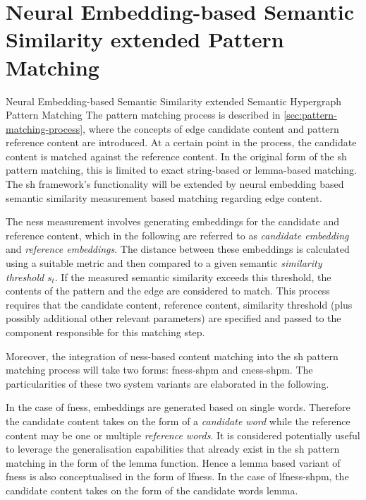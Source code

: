 \documentclass[11pt]{scrreprt}
\begin{document}
\section{Neural Embedding-based Semantic Similarity extended Pattern Matching}{Neural Embedding-based Semantic Similarity extended Semantic Hypergraph Pattern Matching}
The pattern matching process is described in \cref{sec:pattern-matching-process}, where the concepts of edge candidate content and pattern reference content are introduced. At a certain point in the process, the candidate content is matched against the reference content. In the original form of the \gls{sh} pattern matching, this is limited to exact string-based or lemma-based matching. The \gls{sh} framework's functionality will be extended by neural embedding based semantic similarity measurement based matching regarding edge content.

The \gls{ness} measurement involves generating embeddings for the candidate and reference content, which in the following are referred to as \textit{candidate embedding} and \textit{reference embeddings}. The distance between these embeddings is calculated using a suitable metric and then compared to a given semantic \textit{similarity threshold} \(s_t\). If the measured semantic similarity exceeds this threshold, the contents of the pattern and the edge are considered to match. This process requires that the candidate content, reference content, similarity threshold (plus possibly additional other relevant parameters) are specified and passed to the component responsible for this matching step.

Moreover, the integration of \gls{ness}-based content matching into the \gls{sh} pattern matching process will take two forms: \gls{fness-shpm} and \gls{cness-shpm}. The particularities of these two system variants are elaborated in the following.

In the case of \gls{fness}, embeddings are generated based on single words. Therefore the candidate content takes on the form of a \textit{candidate word} while the reference content may be one or multiple \textit{reference words}. It is considered potentially useful to leverage the generalisation capabilities that already exist in the \gls{sh} pattern matching in the form of the lemma function. Hence a lemma based variant of \gls{fness} is also conceptualised in the form of \gls{lfness}. In the case of \gls{lfness-shpm}, the candidate content takes on the form of the candidate words lemma.
\end{document}
